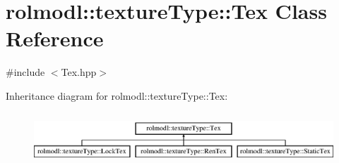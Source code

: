 \hypertarget{classrolmodl_1_1texture_type_1_1_tex}{}\section{rolmodl\+::texture\+Type\+::Tex Class Reference}
\label{classrolmodl_1_1texture_type_1_1_tex}


{\ttfamily \#include $<$Tex.\+hpp$>$}

Inheritance diagram for rolmodl\+::texture\+Type\+::Tex\+:\begin{figure}[H]
\begin{center}
\leavevmode
\includegraphics[height=1.964912cm]{classrolmodl_1_1texture_type_1_1_tex}
\end{center}
\end{figure}
